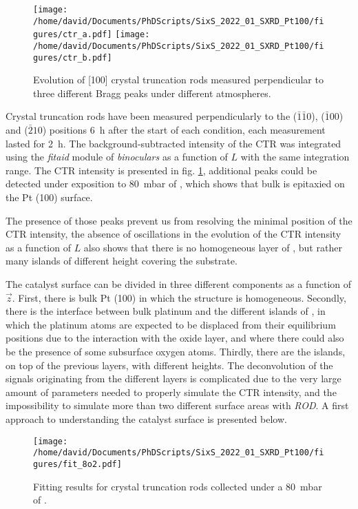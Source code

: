 \begin{figure}[!htb]
    \centering
    \texttt{[image: /home/david/Documents/PhDScripts/SixS\_2022\_01\_SXRD\_Pt100/figures/ctr\_a.pdf]}
    \texttt{[image: /home/david/Documents/PhDScripts/SixS\_2022\_01\_SXRD\_Pt100/figures/ctr\_b.pdf]}
    \caption{
        Evolution of [100] crystal truncation rods measured perpendicular to three different Bragg peaks under different atmospheres.
    }
    \label{fig:CTRPt100}
\end{figure}

Crystal truncation rods have been measured perpendicularly to the ($\bar{1}\bar{1}0$), ($\bar{1}00$) and ($\bar{2}10$) positions \qty{6}{\hour} after the start of each condition, each measurement lasted for \qty{2}{\hour}.
The background-subtracted intensity of the CTR was integrated using the \textit{fitaid} module of \textit{binoculars} as a function of $L$ with the same integration range.
The CTR intensity is presented in fig. \ref{fig:CTRPt100}, additional peaks could be detected under exposition to \qty{80}{\milli\bar} of , which shows that bulk  is epitaxied on the Pt (100) surface.

The presence of those peaks prevent us from resolving the minimal position of the CTR intensity, the absence of oscillations in the evolution of the CTR intensity as a function of $L$ also shows that there is no homogeneous layer of , but rather many islands of different height covering the substrate.

The catalyst surface can be divided in three different components as a function of $\vec{z}$.
First, there is bulk Pt (100) in which the structure is homogeneous.
Secondly, there is the interface between bulk platinum and the different islands of , in which the platinum atoms are expected to be displaced from their equilibrium positions due to the interaction with the oxide layer, and where there could also be the presence of some subsurface oxygen atoms.
Thirdly, there are the  islands, on top of the previous layers, with different heights.
The deconvolution of the signals originating from the different layers is complicated due to the very large amount of parameters needed to properly simulate the CTR intensity, and the impossibility to simulate more than two different surface areas with \textit{ROD}.
A first approach to understanding the catalyst surface is presented below.

\begin{figure}[!htb]
    \centering
    \texttt{[image: /home/david/Documents/PhDScripts/SixS\_2022\_01\_SXRD\_Pt100/figures/fit\_8o2.pdf]}
    \caption{
        Fitting results for crystal truncation rods collected under a \qty{80}{\milli\bar} of .
    }
    \label{fig:CTRFitHighOxygen}
\end{figure}


